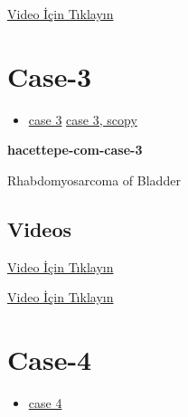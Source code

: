 \documentclass[
  letterpaper,
  DIV=11,
  numbers=noendperiod]{scrreprt}
\providecommand{\tightlist}{%
  \setlength{\itemsep}{0pt}\setlength{\parskip}{0pt}}\usepackage{longtable,booktabs,array}
\begin{document}
\href{https://www.youtube.com/watch?v=xHQihI19L5g}{Video İçin Tıklayın}

\hypertarget{sec-hacettepe-case-of-the-month-case-3}{%
\section{Case-3}\label{sec-hacettepe-case-of-the-month-case-3}}

\begin{itemize}
\tightlist
\item
  \href{https://www.youtube.com/watch?v=JGDsmznBqZM\&ab_channel=KemalKosemehmetoglu}{case
  3}
  \href{https://www.youtube.com/watch?v=yKnEyGE4oD4\&ab_channel=KemalKosemehmetoglu}{case
  3, scopy}
\end{itemize}

\textbf{hacettepe-com-case-3}

\begin{tcolorbox}[enhanced jigsaw, left=2mm, toprule=.15mm, rightrule=.15mm, bottomrule=.15mm, leftrule=.75mm, colback=white, colframe=quarto-callout-tip-color-frame, toptitle=1mm, breakable, titlerule=0mm, colbacktitle=quarto-callout-tip-color!10!white, bottomtitle=1mm, title=\textcolor{quarto-callout-tip-color}{\faLightbulb}\hspace{0.5em}{Tanı}, arc=.35mm, opacitybacktitle=0.6, opacityback=0, coltitle=black]

Rhabdomyosarcoma of Bladder

\end{tcolorbox}

\hypertarget{videos}{%
\subsection{Videos}\label{videos}}

\href{https://www.youtube.com/watch?v=JGDsmznBqZM}{Video İçin Tıklayın}

\href{https://www.youtube.com/watch?v=yKnEyGE4oD4}{Video İçin Tıklayın}

\hypertarget{sec-hacettepe-case-of-the-month-case-4}{%
\section{Case-4}\label{sec-hacettepe-case-of-the-month-case-4}}

\begin{itemize}
\tightlist
\item
  \href{https://www.youtube.com/watch?v=Akp6H3myCIo\&ab_channel=KemalKosemehmetoglu}{case
  4}
\end{itemize}
\end{document}
